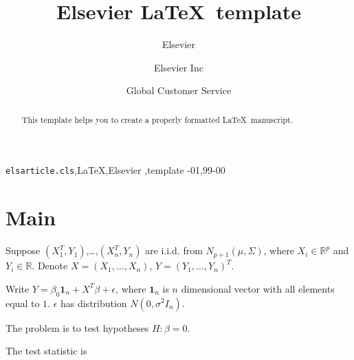 \documentclass[review]{elsarticle}
\begin{document}
\begin{frontmatter}

\title{Elsevier \LaTeX\ template}

\author{Elsevier}
\address{Radarweg 29, Amsterdam}

\author[mymainaddress,mysecondaryaddress]{Elsevier Inc}

\author[mysecondaryaddress]{Global Customer Service}

\address[mymainaddress]{1600 John F Kennedy Boulevard, Philadelphia}
\address[mysecondaryaddress]{360 Park Avenue South, New York}

\begin{abstract}
This template helps you to create a properly formatted \LaTeX\ manuscript.
\end{abstract}

\begin{keyword}
\texttt{elsarticle.cls}\sep \LaTeX\sep Elsevier \sep template
-01\sep  99-00
\end{keyword}

\end{frontmatter}

\linenumbers

\section{Main}

Suppose $(X_1^T,Y_1)$,\ldots,$(X_n^T, Y_n)$ are i.i.d. from $N_{p+1}(\mu,\Sigma)$, where $X_i\in \mathbb{R}^p$ and $Y_i\in \mathbb{R}$. Denote $X=(X_1,\ldots,X_n)$, $Y=(Y_1,\ldots,Y_n)^T$.

Write $Y=\beta_0 \textbf{1}_n+X^T \beta+\epsilon$, where $\textbf{1}_n$ is $n$ dimensional vector with all elements equal to $1$. $\epsilon$ has distribution $N(0,\sigma^2 I_n)$.

The problem is to test hypotheses $H: \beta=0$.

The test statistic is
\end{document}
